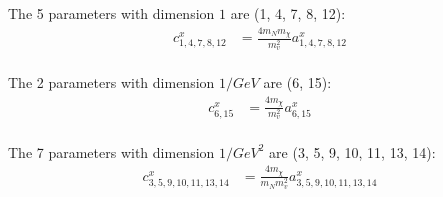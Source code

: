 \documentclass{article}
\begin{document}
The 5 parameters with dimension $1$ are (1, 4, 7, 8, 12):
\begin{align}
    c^x_{1, 4, 7, 8, 12} &= \frac{4 m_N m_\chi}{m_v^2} a^x_{1, 4, 7, 8, 12}\\
\end{align}

The 2 parameters with dimension $1/GeV$ are (6, 15):
\begin{align}
    c^x_{6,15} &= \frac{4 m_\chi}{m_v^2} a^x_{6, 15}\\
\end{align}

The 7 parameters with dimension $1/GeV^2$ are (3, 5, 9, 10, 11, 13, 14):
\begin{align}
    c^x_{3, 5, 9, 10, 11, 13, 14} &= \frac{4 m_\chi}{m_Nm_v^2} a^x_{3, 5, 9, 10,
    11, 13, 14}\\
\end{align}
\end{document}
